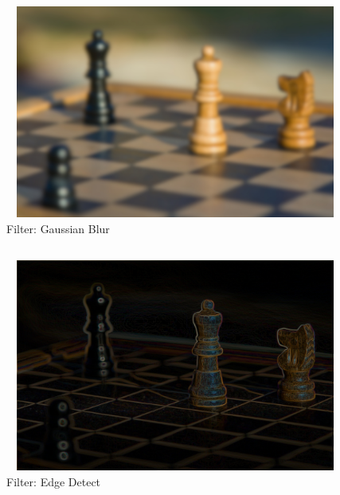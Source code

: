 \documentclass[12pt, a4]{article}
\begin{document}
\subsection*{}
\begin{figure}[h]
\centering
\caption{Filter: Gaussian Blur}
\includegraphics[height=7cm, width=12cm]{Filters/Chess-GaussianBlur.jpeg}
\end{figure}

\subsection*{}
\begin{figure}[h]
\centering
\caption{Filter: Edge Detect}
\includegraphics[height=7cm, width=12cm]{Filters/Chess-EdgeDetect.jpeg}
\end{figure}

\newpage
\end{document}
